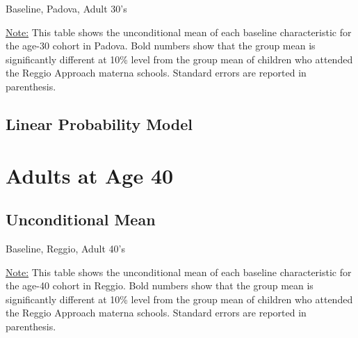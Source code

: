 \documentclass[12pt]{article}
\begin{document}
\begin{table}[H]
\caption{Baseline, Padova, Adult 30's} \label{tab:base-padova-age30}
\begin{center}
\scalebox{0.8}{

}
\end{center}
\begin{footnotesize}
\vspace{0.5mm} 

\underline{Note:} This table shows the unconditional mean of each baseline characteristic for the age-30 cohort in Padova. Bold numbers show that the group mean is significantly different at 10\% level from the group mean of children who attended the Reggio Approach materna schools. Standard errors are reported in parenthesis. 
\end{footnotesize}
\end{table}


\subsection{Linear Probability Model}






\section{Adults at Age 40}
\subsection{Unconditional Mean}
\begin{table}[H]
\caption{Baseline, Reggio, Adult 40's} \label{tab:base-reggio-age40}
\begin{center}
\scalebox{0.8}{

}
\end{center}
\begin{footnotesize}
\vspace{0.5mm} 

\underline{Note:} This table shows the unconditional mean of each baseline characteristic for the age-40 cohort in Reggio. Bold numbers show that the group mean is significantly different at 10\% level from the group mean of children who attended the Reggio Approach materna schools. Standard errors are reported in parenthesis. 
\end{footnotesize}
\end{table}
\end{document}

